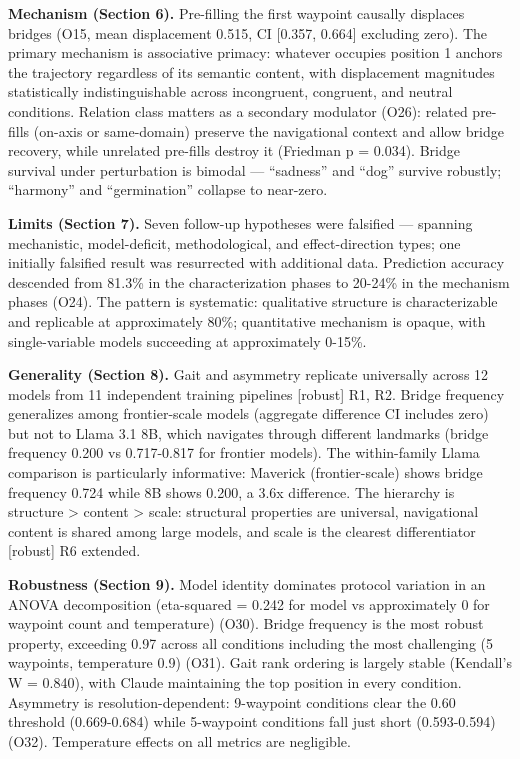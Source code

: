 \textbf{Mechanism (Section 6).} Pre-filling the first waypoint causally displaces bridges (O15, mean displacement 0.515, CI {[}0.357, 0.664{]} excluding zero). The primary mechanism is associative primacy: whatever occupies position 1 anchors the trajectory regardless of its semantic content, with displacement magnitudes statistically indistinguishable across incongruent, congruent, and neutral conditions. Relation class matters as a secondary modulator (O26): related pre-fills (on-axis or same-domain) preserve the navigational context and allow bridge recovery, while unrelated pre-fills destroy it (Friedman p = 0.034). Bridge survival under perturbation is bimodal --- ``sadness'' and ``dog'' survive robustly; ``harmony'' and ``germination'' collapse to near-zero.

\textbf{Limits (Section 7).} Seven follow-up hypotheses were falsified --- spanning mechanistic, model-deficit, methodological, and effect-direction types; one initially falsified result was resurrected with additional data. Prediction accuracy descended from 81.3\% in the characterization phases to 20-24\% in the mechanism phases (O24). The pattern is systematic: qualitative structure is characterizable and replicable at approximately 80\%; quantitative mechanism is opaque, with single-variable models succeeding at approximately 0-15\%.

\textbf{Generality (Section 8).} Gait and asymmetry replicate universally across 12 models from 11 independent training pipelines {[}robust{]} R1, R2. Bridge frequency generalizes among frontier-scale models (aggregate difference CI includes zero) but not to Llama 3.1 8B, which navigates through different landmarks (bridge frequency 0.200 vs 0.717-0.817 for frontier models). The within-family Llama comparison is particularly informative: Maverick (frontier-scale) shows bridge frequency 0.724 while 8B shows 0.200, a 3.6x difference. The hierarchy is structure \textgreater{} content \textgreater{} scale: structural properties are universal, navigational content is shared among large models, and scale is the clearest differentiator {[}robust{]} R6 extended.

\textbf{Robustness (Section 9).} Model identity dominates protocol variation in an ANOVA decomposition (eta-squared = 0.242 for model vs approximately 0 for waypoint count and temperature) (O30). Bridge frequency is the most robust property, exceeding 0.97 across all conditions including the most challenging (5 waypoints, temperature 0.9) (O31). Gait rank ordering is largely stable (Kendall's W = 0.840), with Claude maintaining the top position in every condition. Asymmetry is resolution-dependent: 9-waypoint conditions clear the 0.60 threshold (0.669-0.684) while 5-waypoint conditions fall just short (0.593-0.594) (O32). Temperature effects on all metrics are negligible.

